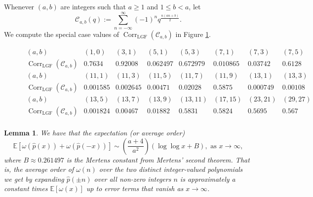\documentclass[12pt,reqno,a4letter]{article}
\numberwithin{figure}{section}
\numberwithin{table}{section}
\numberwithin{equation}{section}
\theoremstyle{plain}
\newtheorem{lemma}[theorem]{Lemma}
\numberwithin{theorem}{section}
\theoremstyle{definition}
\begin{document}
Whenever $(a, b)$ are integers such that $a \geq 1$ and $1 \leq b < a$, let 
\[
\mathcal{C}_{a,b}(q) := \sum_{n=-\infty}^{\infty} (-1)^n q^{\frac{n(an+b)}{2}}. 
\]
We compute the special case values of 
$\operatorname{Corr}_{\operatorname{LGF}}(\mathcal{C}_{a,b})$ 
in Figure \ref{figure_CorrLGFCab_v1}. 

\begin{figure}[h!]

\small
\begin{equation*}
\boxed{
\begin{array}{l|l|l|l|l|l|l|l}
(a, b) & (1, 0) & (3, 1) & (5, 1) & (5, 3) & (7, 1) & (7, 3) & (7, 5) \\ \hline
\operatorname{Corr}_{\operatorname{LGF}}(\mathcal{C}_{a,b}) & 
     0.7634 & 0.92008 & 0.062497 & 0.672979 & 0.010865 & 0.03742 & 0.6128 \\ \hline\hline
(a, b) & (11, 1) & (11, 3) & (11, 5) & (11, 7) & (11, 9) & (13, 1) & (13, 3) \\ \hline
\operatorname{Corr}_{\operatorname{LGF}}(\mathcal{C}_{a,b}) & 
     0.001585 & 0.002645 & 0.00471 & 0.02028 & 0.5875 & 0.000749 & 0.00108 \\ \hline\hline 
(a, b) & (13, 5) & (13, 7) & (13, 9) & (13, 11) & (17, 15) & (23, 21) & (29, 27) \\ \hline
\operatorname{Corr}_{\operatorname{LGF}}(\mathcal{C}_{a,b}) & 
     0.001824 & 0.00467 & 0.01882 & 0.5831 & 0.5824 & 0.5695 & 0.567 \\ 
\end{array}
}
\end{equation*}

\caption[Numerical computations of correlation statistics for LGFs]{}
\label{figure_CorrLGFCab_v1}

\end{figure}

\begin{lemma}
\label{lemma_AvgOrder_of_omegan_along_quadratic_polys_v1} 
We have that the expectation (or average order)
\[
\mathbb{E}\left[\omega(\hat{p}(x)) + \omega(\hat{p}(-x))\right] 
     \sim \left(\frac{a+4}{a^2}\right) \left(\log\log x + B\right), 
     \text{ as } x \rightarrow \infty, 
\]
where $B \approx 0.261497$ is the \emph{Mertens constant} from Mertens' second theorem. 
That is, the average order of $\omega(n)$ over 
the two distinct integer-valued polynomials 
we get by expanding $\hat{p}(\pm n)$ over all non-zero integers $n$ is approximately 
a constant times $\mathbb{E}[\omega(x)]$ up to error terms that vanish as 
$x \rightarrow \infty$. 
\end{lemma}
\end{document}
